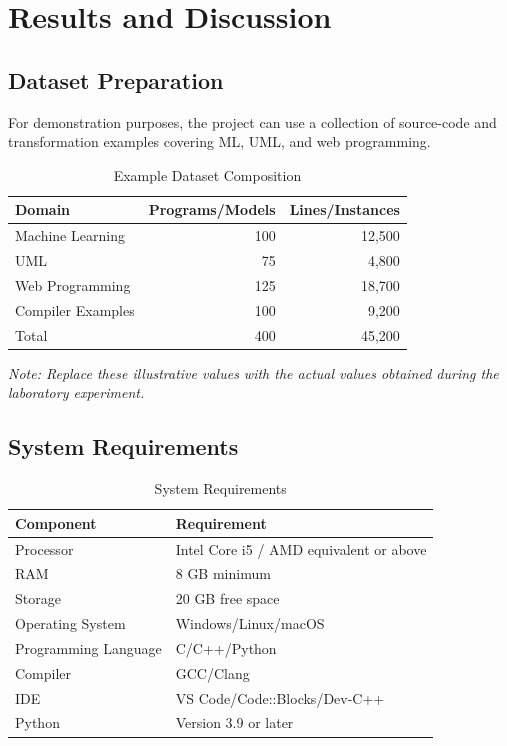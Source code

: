 \documentclass[12pt,a4paper]{article}
\begin{document}
\newpage

\section{Results and Discussion}

\subsection{Dataset Preparation}

For demonstration purposes, the project can use a collection of source-code
and transformation examples covering ML, UML, and web programming.

\begin{table}[H]
\centering
\caption{Example Dataset Composition}
\label{tab:dataset}
\begin{tabular}{lrr}
\toprule
\textbf{Domain} & \textbf{Programs/Models} & \textbf{Lines/Instances}\\
\midrule
Machine Learning & 100 & 12,500\\
UML & 75 & 4,800\\
Web Programming & 125 & 18,700\\
Compiler Examples & 100 & 9,200\\
\midrule
Total & 400 & 45,200\\
\bottomrule
\end{tabular}
\end{table}

\textit{Note: Replace these illustrative values with the actual values obtained
during the laboratory experiment.}

\subsection{System Requirements}

\begin{table}[H]
\centering
\caption{System Requirements}
\begin{tabular}{ll}
\toprule
\textbf{Component} & \textbf{Requirement}\\
\midrule
Processor & Intel Core i5 / AMD equivalent or above\\
RAM & 8 GB minimum\\
Storage & 20 GB free space\\
Operating System & Windows/Linux/macOS\\
Programming Language & C/C++/Python\\
Compiler & GCC/Clang\\
IDE & VS Code/Code::Blocks/Dev-C++\\
Python & Version 3.9 or later\\
\bottomrule
\end{tabular}
\end{table}
\end{document}
